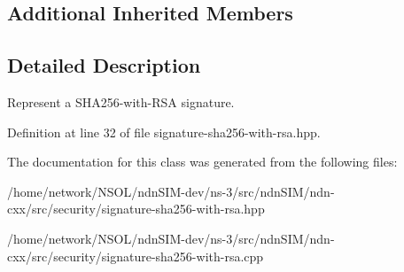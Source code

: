 \subsection*{Additional Inherited Members}


\subsection{Detailed Description}
Represent a S\+H\+A256-\/with-\/\+R\+SA signature. 

Definition at line 32 of file signature-\/sha256-\/with-\/rsa.\+hpp.



The documentation for this class was generated from the following files\+:\begin{DoxyCompactItemize}
\item 
/home/network/\+N\+S\+O\+L/ndn\+S\+I\+M-\/dev/ns-\/3/src/ndn\+S\+I\+M/ndn-\/cxx/src/security/signature-\/sha256-\/with-\/rsa.\+hpp\item 
/home/network/\+N\+S\+O\+L/ndn\+S\+I\+M-\/dev/ns-\/3/src/ndn\+S\+I\+M/ndn-\/cxx/src/security/signature-\/sha256-\/with-\/rsa.\+cpp\end{DoxyCompactItemize}
